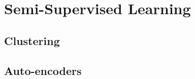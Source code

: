 \section{Semi-Supervised Learning}
\label{sec:semisupervised}

\subsection{Clustering}


\subsection{Auto-encoders}

